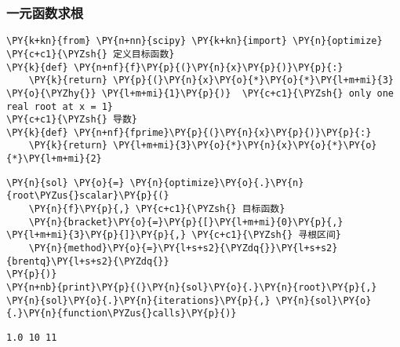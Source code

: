     \hypertarget{ux4e00ux5143ux51fdux6570ux6c42ux6839}{%
\subsubsection{一元函数求根}\label{ux4e00ux5143ux51fdux6570ux6c42ux6839}}

    \begin{tcolorbox}[breakable, size=fbox, boxrule=1pt, pad at break*=1mm,colback=cellbackground, colframe=cellborder]
\begin{Verbatim}[commandchars=\\\{\}]
\PY{k+kn}{from} \PY{n+nn}{scipy} \PY{k+kn}{import} \PY{n}{optimize}
\PY{c+c1}{\PYZsh{} 定义目标函数}
\PY{k}{def} \PY{n+nf}{f}\PY{p}{(}\PY{n}{x}\PY{p}{)}\PY{p}{:}
    \PY{k}{return} \PY{p}{(}\PY{n}{x}\PY{o}{*}\PY{o}{*}\PY{l+m+mi}{3} \PY{o}{\PYZhy{}} \PY{l+m+mi}{1}\PY{p}{)}  \PY{c+c1}{\PYZsh{} only one real root at x = 1}
\PY{c+c1}{\PYZsh{} 导数}
\PY{k}{def} \PY{n+nf}{fprime}\PY{p}{(}\PY{n}{x}\PY{p}{)}\PY{p}{:}
    \PY{k}{return} \PY{l+m+mi}{3}\PY{o}{*}\PY{n}{x}\PY{o}{*}\PY{o}{*}\PY{l+m+mi}{2}
\end{Verbatim}
\end{tcolorbox}

    \begin{tcolorbox}[breakable, size=fbox, boxrule=1pt, pad at break*=1mm,colback=cellbackground, colframe=cellborder]
\begin{Verbatim}[commandchars=\\\{\}]
\PY{n}{sol} \PY{o}{=} \PY{n}{optimize}\PY{o}{.}\PY{n}{root\PYZus{}scalar}\PY{p}{(}
    \PY{n}{f}\PY{p}{,} \PY{c+c1}{\PYZsh{} 目标函数}
    \PY{n}{bracket}\PY{o}{=}\PY{p}{[}\PY{l+m+mi}{0}\PY{p}{,} \PY{l+m+mi}{3}\PY{p}{]}\PY{p}{,} \PY{c+c1}{\PYZsh{} 寻根区间}
    \PY{n}{method}\PY{o}{=}\PY{l+s+s2}{\PYZdq{}}\PY{l+s+s2}{brentq}\PY{l+s+s2}{\PYZdq{}}
\PY{p}{)}
\PY{n+nb}{print}\PY{p}{(}\PY{n}{sol}\PY{o}{.}\PY{n}{root}\PY{p}{,} \PY{n}{sol}\PY{o}{.}\PY{n}{iterations}\PY{p}{,} \PY{n}{sol}\PY{o}{.}\PY{n}{function\PYZus{}calls}\PY{p}{)}
\end{Verbatim}
\end{tcolorbox}

    \begin{Verbatim}[commandchars=\\\{\}]
1.0 10 11
    \end{Verbatim}

